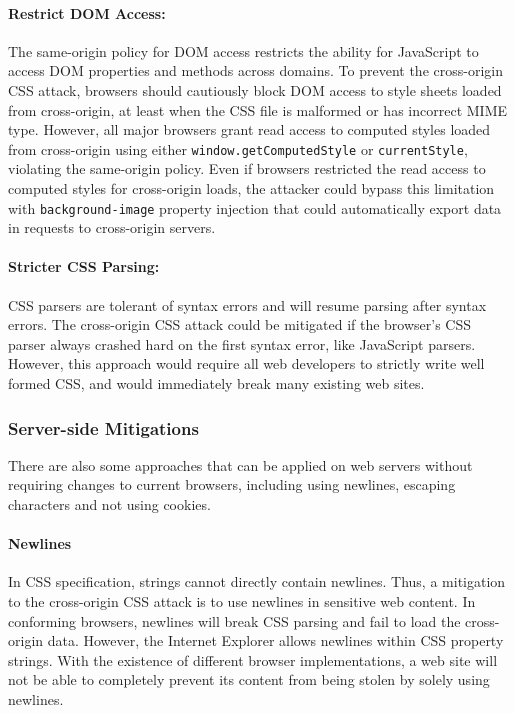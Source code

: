 \documentclass{acm_proc_article-sp}
\begin{document}
{\paragraph{Restrict DOM Access:}
The same-origin policy for DOM access restricts the ability for JavaScript to access DOM properties and methods across domains. To prevent the cross-origin CSS attack, browsers should cautiously block DOM access to style sheets loaded from cross-origin, at least when the CSS file is malformed or has incorrect MIME type. However, all major browsers grant read access to computed styles loaded from cross-origin using either \texttt{window.getComputedStyle} or \texttt{currentStyle}, violating the same-origin policy. Even if browsers restricted the read access to computed styles for cross-origin loads, the attacker could bypass this limitation with \texttt{background-image} property injection that could automatically export data in requests to cross-origin servers.

\paragraph{Stricter CSS Parsing:}
CSS parsers are tolerant of syntax errors and will resume parsing after syntax errors. The cross-origin CSS attack could be mitigated if the browser's CSS parser always crashed hard on the first syntax error, like JavaScript parsers. However, this approach would require all web developers to strictly write well formed CSS, and would immediately break many existing web sites.

\subsubsection{Server-side Mitigations}
There are also some approaches that can be applied on web servers without requiring changes to current browsers, including using newlines, escaping characters and not using cookies.

\paragraph{Newlines}
In CSS specification, strings cannot directly contain newlines. Thus, a mitigation to the cross-origin CSS attack is to use newlines in sensitive web content. In conforming browsers, newlines will break CSS parsing and fail to load the cross-origin data. However, the Internet Explorer allows newlines within CSS property strings. With the existence of different browser implementations, a web site will not be able to completely prevent its content from being stolen by solely using newlines.

}
\end{document}
